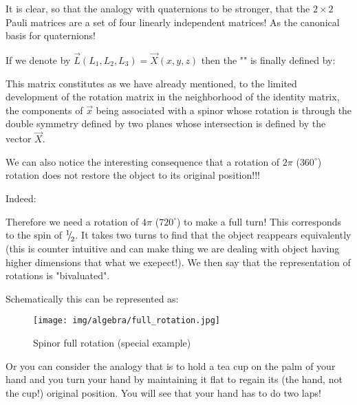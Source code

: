 	It is clear, so that the analogy with quaternions to be stronger, that the $2\times 2$ Pauli matrices are a set of four linearly independent matrices! As the canonical basis for quaternions!
	
	If we denote by $\vec{L}(L_1,L_2,L_3)=\vec{X}(x,y,z)$  then the "" is finally defined by:
	
	This matrix constitutes as we have already mentioned, to the limited development of the rotation matrix in the neighborhood of the identity matrix, the components of $\vec{x}$ being associated with a spinor whose rotation is through the double symmetry defined by two planes whose intersection is defined by the vector $\vec{X}$.
	
	We can also notice the interesting consequence that a rotation of $2\pi$ ($360^\circ$) rotation does not restore the object to its original position!!!
	
	Indeed:
	
	Therefore we need a rotation of $4\pi$ ($720^\circ$) to make a full turn! This corresponds to the spin of ${}^1{\mskip -5mu/\mskip -3mu}_2$. It takes two turns to find that the object reappears equivalently (this is counter intuitive and can make thing we are dealing with object having higher dimensions that what we exepect!). We then say that the representation of rotations is "bivaluated".
	
	Schematically this can be represented as:
	\begin{figure}[H]
		\centering
		\texttt{[image: img/algebra/full\_rotation.jpg]}
		\caption{Spinor full rotation (special example)}
	\end{figure}
	Or you can consider the analogy that is to hold a tea cup on the palm of your hand and you turn your hand by maintaining it flat to regain its (the hand, not the cup!) original position. You will see that your hand has to do two laps!
	
	\pagebreak
